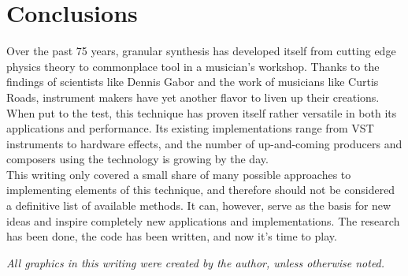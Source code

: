 \documentclass[10pt, twocolumn]{IEEEtran}
\begin{document}
\section*{Conclusions}
Over the past 75 years, granular synthesis has developed itself from cutting edge physics theory to commonplace tool in a musician's workshop. Thanks to the findings of scientists like Dennis Gabor and the work of musicians like Curtis Roads, instrument makers have yet another flavor to liven up their creations. When put to the test, this technique has proven itself rather versatile in both its applications and performance. Its existing implementations range from VST instruments to hardware effects, and the number of up-and-coming producers and composers using the technology is growing by the day.\\
This writing only covered a small share of many possible approaches to implementing elements of this technique, and therefore should not be considered a definitive list of available methods. It can, however, serve as the basis for new ideas and inspire completely new applications and implementations. The research has been done, the code has been written, and now it's time to play.

\printbibliography
\textit{All graphics in this writing were created by the author, unless otherwise noted.}
\end{document}
